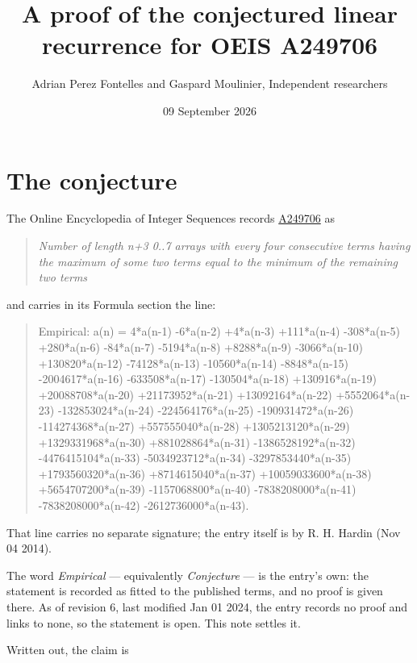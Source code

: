 \documentclass[11pt]{article}
\title{A proof of the conjectured linear recurrence for OEIS A249706}
\author{Adrian Perez Fontelles and Gaspard Moulinier, Independent researchers}
\date{09 September 2026}
\theoremstyle{definition}
\begin{document}
\maketitle
\section{The conjecture}

The Online Encyclopedia of Integer Sequences records \href{https://oeis.org/A249706}{A249706} as

\begin{quote}\itshape Number of length n+3 0..7 arrays with every four consecutive terms having the maximum of some two terms equal to the minimum of the remaining two terms\end{quote}

and carries in its Formula section the line:

\begin{quote}\ttfamily Empirical: a(n) = 4*a(n-1) -6*a(n-2) +4*a(n-3) +111*a(n-4) -308*a(n-5) +280*a(n-6) -84*a(n-7) -5194*a(n-8) +8288*a(n-9) -3066*a(n-10) +130820*a(n-12) -74128*a(n-13) -10560*a(n-14) -8848*a(n-15) -2004617*a(n-16) -633508*a(n-17) -130504*a(n-18) +130916*a(n-19) +20088708*a(n-20) +21173952*a(n-21) +13092164*a(n-22) +5552064*a(n-23) -132853024*a(n-24) -224564176*a(n-25) -190931472*a(n-26) -114274368*a(n-27) +557555040*a(n-28) +1305213120*a(n-29) +1329331968*a(n-30) +881028864*a(n-31) -1386528192*a(n-32) -4476415104*a(n-33) -5034923712*a(n-34) -3297853440*a(n-35) +1793560320*a(n-36) +8714615040*a(n-37) +10059033600*a(n-38) +5654707200*a(n-39) -1157068800*a(n-40) -7838208000*a(n-41) -7838208000*a(n-42) -2612736000*a(n-43).\end{quote}

That line carries no separate signature; the entry itself is by R. H. Hardin (Nov 04 2014).

The word {\itshape Empirical} --- equivalently {\itshape Conjecture} --- is the entry's own: the statement is recorded as fitted to the published terms, and no proof is given there. As of revision 6, last modified Jan 01 2024, the entry records no proof and links to none, so the statement is open. This note settles it.

Written out, the claim is
\end{document}

